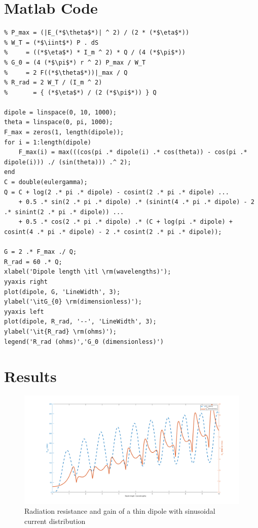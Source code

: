 \documentclass[a4paper, 12pt, english]{article}
\begin{document}
\newpage
\section{Matlab Code}
\begin{lstlisting}[style=matlab,caption={Matlab code},captionpos=b]
% |E_(*$\theta$*)| = ((*$\eta$*) * I_m) / (2 (*$\pi$*) r) { [cos(((*$\beta$*)l/2)cos((*$\theta$*))) - cos((*$\beta$*)l/2)] / sin((*$\theta$*)) }
% P_max = (|E_(*$\theta$*)| ^ 2) / (2 * (*$\eta$*))
% W_T = (*$\iint$*) P . dS
%     = ((*$\eta$*) * I_m ^ 2) * Q / (4 (*$\pi$*)) 
% G_0 = (4 (*$\pi$*) r ^ 2) P_max / W_T
%     = 2 F((*$\theta$*))|_max / Q
% R_rad = 2 W_T / (I_m ^ 2)
%       = { (*$\eta$*) / (2 (*$\pi$*)) } Q

dipole = linspace(0, 10, 1000);
theta = linspace(0, pi, 1000);
F_max = zeros(1, length(dipole));
for i = 1:length(dipole)
    F_max(i) = max(((cos(pi .* dipole(i) .* cos(theta)) - cos(pi .* dipole(i))) ./ (sin(theta))) .^ 2);
end
C = double(eulergamma);
Q = C + log(2 .* pi .* dipole) - cosint(2 .* pi .* dipole) ...
    + 0.5 .* sin(2 .* pi .* dipole) .* (sinint(4 .* pi .* dipole) - 2 .* sinint(2 .* pi .* dipole)) ...
    + 0.5 .* cos(2 .* pi .* dipole) .* (C + log(pi .* dipole) + cosint(4 .* pi .* dipole) - 2 .* cosint(2 .* pi .* dipole));

G = 2 .* F_max ./ Q;
R_rad = 60 .* Q;
xlabel('Dipole length \itl \rm(wavelengths)');
yyaxis right
plot(dipole, G, 'LineWidth', 3);
ylabel('\itG_{0} \rm(dimensionless)');
yyaxis left
plot(dipole, R_rad, '--', 'LineWidth', 3);
ylabel('\it{R_rad} \rm(ohms)');
legend('R_rad (ohms)','G_0 (dimensionless)')
\end{lstlisting}
\section{Results}
\begin{figure}[H]
    \centering
    \includegraphics[width=\linewidth]{images/linearAntenna.png}
    \caption{Radiation resistance and gain of a thin dipole with sinusoidal current distribution}
\end{figure}
\end{document}
